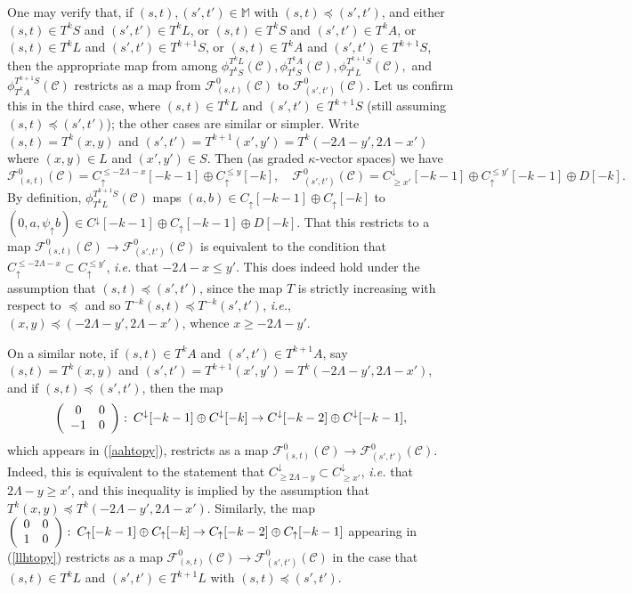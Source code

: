 \documentclass[11pt]{amsart}
\theoremstyle{definition}
\theoremstyle{remark}
\numberwithin{equation}{section}
\def\co{\colon\thinspace}
\begin{document}
One may verify that, if $(s,t),(s',t')\in\mathbb{M}$ with $(s,t)\preceq (s',t')$,  and either $(s,t)\in T^kS$ and $(s',t')\in T^kL$, or $(s,t)\in T^kS$ and $(s',t')\in T^kA$, or $(s,t)\in T^kL$ and $(s',t')\in T^{k+1}S$, or $(s,t)\in T^kA$ and $(s',t')\in T^{k+1}S$, then the appropriate map from among $\phi_{T^kS}^{T^kL}(\mathcal{C}), \phi_{T^kS}^{T^kA}(\mathcal{C}), \phi_{T^kL}^{T^{k+1}S}(\mathcal{C}),$ and  $\phi_{T^kA}^{T^{k+1}S}(\mathcal{C})$ restricts as a map from $\mathcal{F}_{(s,t)}^{0}(\mathcal{C})$ to $\mathcal{F}_{(s',t')}^{0}(\mathcal{C})$.  Let us confirm this in the third case, where  $(s,t)\in T^kL$ and $(s',t')\in T^{k+1}S$ (still assuming $(s,t)\preceq (s',t')$); the other cases are similar or simpler.  Write $(s,t)=T^k(x,y)$ and $(s',t')=T^{k+1}(x',y')=T^k(-2\Lambda-y',2\Lambda-x')$ where $(x,y)\in L$ and $(x',y')\in S$.  Then (as graded $\kappa$-vector spaces) we have \[ \mathcal{F}_{(s,t)}^{0}(\mathcal{C})=C_{\uparrow}^{\leq -2\Lambda-x}[-k-1]\oplus C_{\uparrow}^{\leq y}[-k],\quad \mathcal{F}_{(s',t')}^{0}(\mathcal{C})=C^{\downarrow}_{\geq x'}[-k-1]\oplus C_{\uparrow}^{\leq y'}[-k-1]\oplus D[-k].\]  
By definition, $\phi_{T^kL}^{T^{k+1}S}(\mathcal{C})$ maps $(a,b)\in C_{\uparrow}[-k-1]\oplus C_{\uparrow}[-k]$ to $(0,a,\psi_{\uparrow}b)\in C^{\downarrow}[-k-1]\oplus C_{\uparrow}[-k-1]\oplus D[-k]$.  That this restricts to a map $\mathcal{F}_{(s,t)}^{0}(\mathcal{C})\to \mathcal{F}_{(s',t')}^{0}(\mathcal{C})$ is equivalent to the condition that $C_{\uparrow}^{\leq -2\Lambda-x}\subset C_{\uparrow}^{\leq y'}$, \emph{i.e.} that $-2\Lambda-x\leq y'$. This  does indeed hold under the assumption that $(s,t)\preceq (s',t')$, since the map $T$ is strictly increasing with respect to $\preceq$ and so $T^{-k}(s,t)\preceq T^{-k}(s',t')$, \emph{i.e.}, $(x,y)\preceq (-2\Lambda-y',2\Lambda-x')$, whence $x\geq -2\Lambda-y'$.

On a similar note, if $(s,t)\in T^kA$ and $(s',t')\in T^{k+1}A$, say $(s,t)=T^k(x,y)$ and $(s',t')=T^{k+1}(x',y')=T^k(-2\Lambda-y',2\Lambda-x')$, and if $(s,t)\preceq (s',t')$, then the map \[ \left(\begin{array}{cc} 0 & 0 \\ -1 & 0\end{array}\right)\co C^{\downarrow}[-k-1]\oplus C^{\downarrow}[-k] \to C^{\downarrow}[-k-2]\oplus C^{\downarrow}[-k-1],   \] which appears in (\ref{aahtopy}), restricts as a map $\mathcal{F}_{(s,t)}^{0}(\mathcal{C})\to \mathcal{F}_{(s',t')}^{0}(\mathcal{C})$.  Indeed, this is equivalent to the statement that $C^{\downarrow}_{\geq 2\Lambda-y}\subset C^{\downarrow}_{\geq x'}$, \emph{i.e.} that $2\Lambda-y\geq x'$, and this inequality is implied by the assumption that $T^k(x,y)\preceq T^{k}(-2\Lambda-y',2\Lambda-x')$.  Similarly, the map $\left(\begin{array}{cc} 0 & 0 \\ 1 & 0\end{array}\right)\co C_{\uparrow}[-k-1]\oplus C_{\uparrow}[-k]\to C_{\uparrow}[-k-2]\oplus C_{\uparrow}[-k-1]$ appearing in  (\ref{llhtopy}) restricts as a map $\mathcal{F}_{(s,t)}^{0}(\mathcal{C})\to \mathcal{F}_{(s',t')}^{0}(\mathcal{C})$ in the case that $(s,t)\in T^kL$ and $(s',t')\in T^{k+1}L$ with $(s,t)\preceq (s',t')$.  
\end{document}
